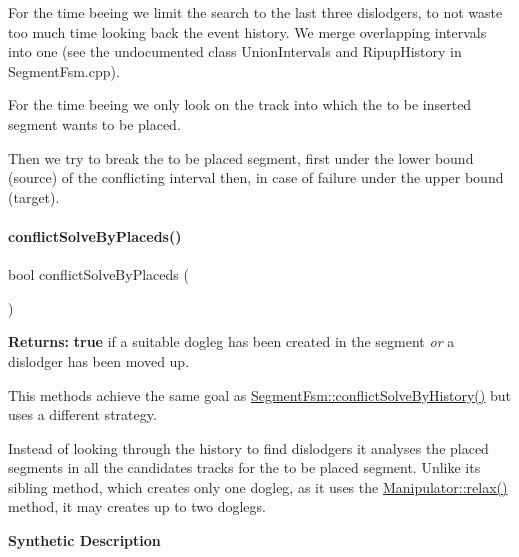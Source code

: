 For the time beeing we limit the search to the last three dislodgers, to not waste too much time looking back the event history. We merge overlapping intervals into one (see the undocumented class {\ttfamily Union\+Intervals} and {\ttfamily Ripup\+History} in {\ttfamily Segment\+Fsm.\+cpp}).

For the time beeing we only look on the track into which the to be inserted segment wants to be placed.

Then we try to break the to be placed segment, first under the lower bound (source) of the conflicting interval then, in case of failure under the upper bound (target).

 \mbox{\label{classKite_1_1SegmentFsm_a9c0fa6a9067b6e027e24f38330f627dc}} 
\paragraph{\texorpdfstring{conflict\+Solve\+By\+Placeds()}{conflictSolveByPlaceds()}}
{\footnotesize\ttfamily bool conflict\+Solve\+By\+Placeds (\begin{DoxyParamCaption}{ }\end{DoxyParamCaption})}

{\bfseries Returns\+:} {\bfseries true} if a suitable dogleg has been created in the segment {\itshape or} a dislodger has been moved up.

This methods achieve the same goal as \mbox{\hyperlink{classKite_1_1SegmentFsm_a0d9a9926ae67cc7998799347f135e28a}{Segment\+Fsm\+::conflict\+Solve\+By\+History()}} but uses a different strategy.

Instead of looking through the history to find dislodgers it analyses the placed segments in all the candidates tracks for the to be placed segment. Unlike it\textquotesingle{}s sibling method, which creates only one dogleg, as it uses the \mbox{\hyperlink{classKite_1_1Manipulator_a8b5b69fd5762d5a0cbc4ceea4d1b68c1}{Manipulator\+::relax()}} method, it may creates up to two doglegs.

{\bfseries Synthetic Description}


